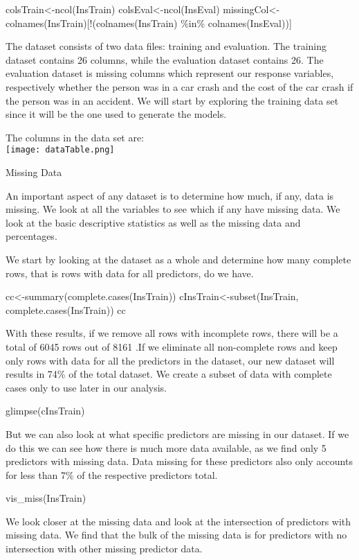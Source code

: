 \documentclass[]{article}
\begin{document}
colsTrain\textless-ncol(InsTrain) colsEval\textless-ncol(InsEval)
missingCol\textless-colnames(InsTrain){[}!(colnames(InsTrain) \%in\%
colnames(InsEval)){]}

The dataset consists of two data files: training and evaluation. The
training dataset contains 26 columns, while the evaluation dataset
contains 26. The evaluation dataset is missing columns which represent
our response variables, respectively whether the person was in a car
crash and the cost of the car crash if the person was in an accident. We
will start by exploring the training data set since it will be the one
used to generate the models.

The columns in the data set are:\\
\texttt{[image: dataTable.png]}

Missing Data

An important aspect of any dataset is to determine how much, if any,
data is missing. We look at all the variables to see which if any have
missing data. We look at the basic descriptive statistics as well as the
missing data and percentages.

We start by looking at the dataset as a whole and determine how many
complete rows, that is rows with data for all predictors, do we have.

cc\textless-summary(complete.cases(InsTrain))
cInsTrain\textless-subset(InsTrain, complete.cases(InsTrain)) cc

With these results, if we remove all rows with incomplete rows, there
will be a total of 6045 rows out of 8161 .If we eliminate all
non-complete rows and keep only rows with data for all the predictors in
the dataset, our new dataset will results in 74\% of the total dataset.
We create a subset of data with complete cases only to use later in our
analysis.

glimpse(cInsTrain)

But we can also look at what specific predictors are missing in our
dataset. If we do this we can see how there is much more data available,
as we find only 5 predictors with missing data. Data missing for these
predictors also only accounts for less than 7\% of the respective
predictors total.

vis\_miss(InsTrain)

We look closer at the missing data and look at the intersection of
predictors with missing data. We find that the bulk of the missing data
is for predictors with no intersection with other missing predictor
data.
\end{document}
